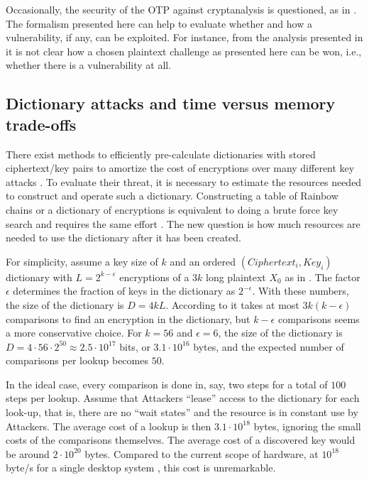 \documentclass{article}
\begin{document}
Occasionally, the security of the OTP against cryptanalysis is questioned, as in 
\cite{Wang:cs0709.4420,Wang:cs0709.3334}. The formalism presented here can help to 
evaluate whether and how a vulnerability, if any, can be exploited.
For instance, from the analysis presented in \cite{Wang:cs0709.4420,Wang:cs0709.3334}
it is not clear how a chosen plaintext challenge as presented here can be won,
i.e., whether there is a vulnerability at all.

\subsection{Dictionary attacks and time versus memory trade-offs}

There exist methods to efficiently pre-calculate dictionaries with stored
ciphertext/key pairs to amortize the cost of encryptions over many different key
attacks \cite{an-Ping:cs0710.2970,Oechslin03}. To evaluate their threat, it is
necessary to estimate the resources needed to construct and operate such a
dictionary.
Constructing a table of Rainbow chains or a dictionary of
encryptions is equivalent to doing a brute force key search and requires the
same effort \cite{an-Ping:cs0710.2970,Oechslin03}.
The new question is how much resources are needed to use the dictionary
after it has been created.

For simplicity, assume a key size of $k$ and an ordered $(Ciphertext_i, Key_i)$
dictionary with $L = 2^{k-\epsilon}$ encryptions of a $3k$ long plaintext $X_0$
as in \cite{an-Ping:cs0710.2970}. The factor $\epsilon$ determines the fraction
of keys in the dictionary as $2^{-\epsilon}$. With these numbers, the size of
the dictionary is $D = 4kL$. According to \cite{an-Ping:cs0710.2970} it takes
at most $3k(k-\epsilon)$ comparisons to find an encryption in the dictionary,
but $k-\epsilon$ comparisons seems a more conservative choice. For $k=56$ and
$\epsilon = 6$, the size of the dictionary is $D = 4\cdot 56 \cdot 2^{50}
\approx 2.5\cdot 10^{17}$ bits,
or $3.1 \cdot 10^{16}$ bytes, and the expected number of comparisons per lookup
becomes $50$.

In the ideal case, every comparison is done in, say, two steps for a total of
$100$ steps per lookup. Assume that Attackers ``lease'' access to the
dictionary for each look-up, that is, there are no ``wait states'' and the resource
is in constant use by Attackers. The average
cost of a lookup is then $3.1 \cdot 10^{18}$ bytes, ignoring the small costs of the
comparisons themselves. The average cost of a discovered key would be around $2
\cdot 10^{20}$ bytes. Compared to the current scope of hardware, at $10^{18}$
byte/s for a single desktop system \cite{Son0911-5262}, this cost is unremarkable. 
\end{document}
